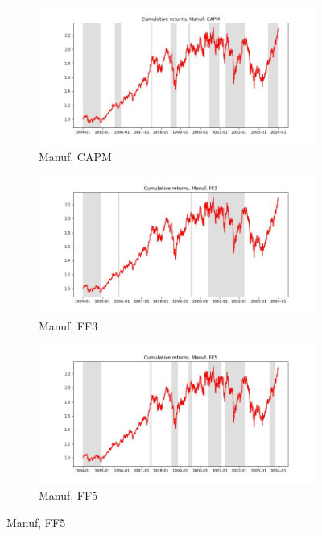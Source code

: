 \documentclass{article}
\begin{document}
 
  \begin{figure}
  \centering
  \begin{subfigure}[b]{0.3\textwidth}
    \centering
    \includegraphics[width=\textwidth]{Manuf/full_cumrets_ofint_CAPM.jpg}
    \caption{Manuf, CAPM}
    \label{fig:1}
  \end{subfigure}
  \begin{subfigure}[b]{0.3\textwidth}
    \centering
    \includegraphics[width=\textwidth]{Manuf/full_cumrets_ofint_FF3.jpg}
    \caption{Manuf, FF3}
    \label{fig:2}
  \end{subfigure}
    \begin{subfigure}[b]{0.3\textwidth}
    \centering
    \includegraphics[width=\textwidth]{Manuf/full_cumrets_ofint_FF5.jpg}
    \caption{Manuf, FF5}
    \label{fig:1}
  \end{subfigure}
  \end{figure}
  
\end{document}
